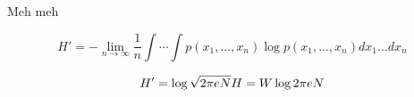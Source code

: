 	
	Meh meh
	
	\begin{equation}
		{H}'=-\lim_{n\rightarrow \infty }\frac{1}{n}\int \cdots \int p\left ( 							x_{1},...,x_{n}\right ) \log p\left ( x_{1},...,x_{n}\right )dx_{1}...dx_{n}
	\end{equation}

	\begin{equation}
		{H}'=\log \sqrt{2\pi eN}
		\newline
		H=W\log 2\pi eN
	\end{equation}	
	



